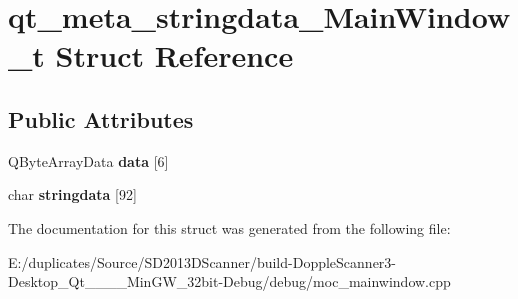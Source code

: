 \hypertarget{structqt__meta__stringdata___main_window__t}{\section{qt\-\_\-meta\-\_\-stringdata\-\_\-\-Main\-Window\-\_\-t Struct Reference}
\label{structqt__meta__stringdata___main_window__t}
}
\subsection*{Public Attributes}
\begin{DoxyCompactItemize}
\item 
\hypertarget{structqt__meta__stringdata___main_window__t_af598c0b01c666753185a38017d12d5cc}{Q\-Byte\-Array\-Data {\bfseries data} \mbox{[}6\mbox{]}}\label{structqt__meta__stringdata___main_window__t_af598c0b01c666753185a38017d12d5cc}

\item 
\hypertarget{structqt__meta__stringdata___main_window__t_a827a4cb99dff5edec6d535a58462376c}{char {\bfseries stringdata} \mbox{[}92\mbox{]}}\label{structqt__meta__stringdata___main_window__t_a827a4cb99dff5edec6d535a58462376c}

\end{DoxyCompactItemize}


The documentation for this struct was generated from the following file\-:\begin{DoxyCompactItemize}
\item 
E\-:/duplicates/\-Source/\-S\-D2013\-D\-Scanner/build-\/\-Dopple\-Scanner3-\/\-Desktop\-\_\-\-Qt\-\_\-\_\-\_\-\_\-\-Min\-G\-W\-\_\-32bit-\/\-Debug/debug/moc\-\_\-mainwindow.\-cpp\end{DoxyCompactItemize}
